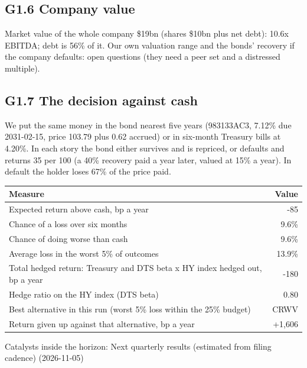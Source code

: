 \documentclass[11pt,a4paper]{article}
\begin{document}
\subsection*{G1.6 Company value}
Market value of the whole company \$19bn (shares \$10bn plus net debt): 10.6x EBITDA; debt is 56\% of it. Our own valuation range and the bonds' recovery if the company defaults: open questions (they need a peer set and a distressed multiple).
\subsection*{G1.7 The decision against cash}
We put the same money in the bond nearest five years (983133AC3, 7.12\% due 2031-02-15, price 103.79 plus 0.62 accrued) or in six-month Treasury bills at 4.20\%. In each story the bond either survives and is repriced, or defaults and returns 35 per 100 (a 40\% recovery paid a year later, valued at 15\% a year). In default the holder loses 67\% of the price paid.
\begin{center}\footnotesize\setlength{\tabcolsep}{3.5pt}\begin{tabular}{@{}lr@{}}\toprule
Measure & Value \\\midrule
Expected return above cash, bp a year & -85 \\
Chance of a loss over six months & 9.6\% \\
Chance of doing worse than cash & 9.6\% \\
Average loss in the worst 5\% of outcomes & 13.9\% \\
Total hedged return: Treasury and DTS beta x HY index hedged out, bp a year & -180 \\
Hedge ratio on the HY index (DTS beta) & 0.80 \\
Best alternative in this run (worst 5\% loss within the 25\% budget) & CRWV \\
Return given up against that alternative, bp a year & +1,606 \\
\bottomrule\end{tabular}\end{center}
Catalysts inside the horizon: Next quarterly results (estimated from filing cadence) (2026-11-05)
\end{document}
